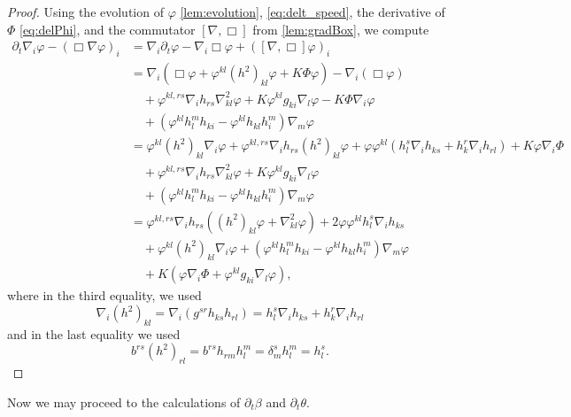 \documentclass[12pt]{amsart}
\begin{document}
\begin{proof}
Using the evolution of \(\varphi\) \cref{lem:evolution}, \cref{eq:delt_speed}, the derivative of \(\Phi\) \cref{eq:delPhi}, and the commutator \([\nabla, \Box]\) from \cref{lem:gradBox}, we compute
\[
\begin{split}
\partial_{t}\nabla_i \varphi - (\Box\nabla \varphi)_{i} &= \nabla_i \partial_t \varphi - \nabla_i \Box \varphi + ([\nabla, \Box] \varphi)_i \\
&= \nabla_i \left(\Box\varphi + \varphi^{kl}(h^2)_{kl}\varphi + K \Phi\varphi\right) - \nabla_i (\Box\varphi) \\
&\quad + \varphi^{kl,rs} \nabla_i h_{rs} \nabla^2_{kl} \varphi + K\varphi^{kl}g_{ki} \nabla_l \varphi - K\Phi\nabla_i \varphi \\
&\quad + (\varphi^{kl}h^{m}_{l}h_{ki} - \varphi^{kl}h_{kl}h^{m}_{i}) \nabla_m \varphi \\
&= \varphi^{kl}(h^2)_{kl}\nabla_i \varphi + \varphi^{kl,rs}\nabla_i h_{rs} (h^2)_{kl}\varphi + \varphi\varphi^{kl}(h^s_l \nabla_i h_{ks} + h^r_k \nabla_i h_{rl}) + K \varphi\nabla_i\Phi \\
&\quad + \varphi^{kl,rs} \nabla_i h_{rs} \nabla^2_{kl} \varphi + K\varphi^{kl}g_{ki}\nabla_l \varphi \\
&\quad + (\varphi^{kl}h^{m}_{l}h_{ki} - \varphi^{kl}h_{kl}h^{m}_{i}) \nabla_m \varphi \\
&= \varphi^{kl,rs}\nabla_i h_{rs} \left((h^2)_{kl}\varphi + \nabla^2_{kl} \varphi\right) + 2 \varphi\varphi^{kl} h^s_l \nabla_i h_{ks} \\
&\quad + \varphi^{kl}(h^2)_{kl}\nabla_i \varphi + (\varphi^{kl}h^{m}_{l}h_{ki} - \varphi^{kl}h_{kl}h^{m}_{i}) \nabla_m \varphi \\
&\quad + K \left(\varphi\nabla_i\Phi + \varphi^{kl}g_{ki}\nabla_l \varphi\right),
\end{split}
\]
where in the third equality, we used
\[
\nabla_i (h^2)_{kl} = \nabla_i (g^{sr} h_{ks} h_{rl}) = h^s_l \nabla_i h_{ks} + h^r_k \nabla_i h_{rl}
\]
and in the last equality we used
\[
b^{rs} (h^2)_{rl} = b^{rs} h_{rm} h^m_l = \delta^s_m h^m_l = h^s_l.
\]
\end{proof}
Now we may proceed to the calculations of \(\partial_t \beta\) and \(\partial_t \theta\).
\end{document}
